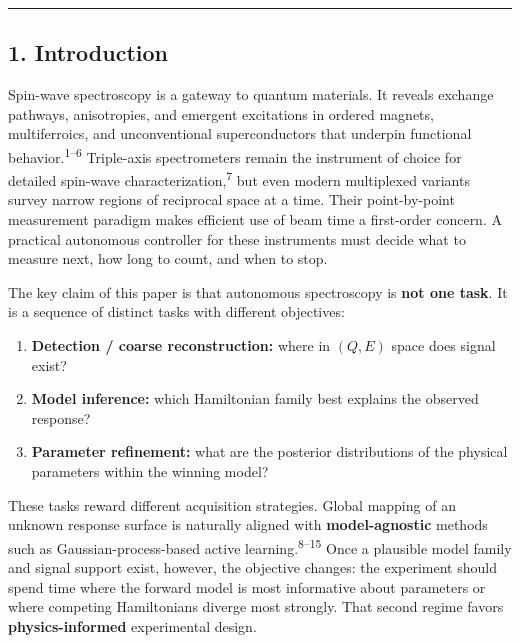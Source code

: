 \documentclass[
]{article}
\providecommand{\tightlist}{%
  \setlength{\itemsep}{0pt}\setlength{\parskip}{0pt}}
\begin{document}
\begin{center}\rule{0.5\linewidth}{0.5pt}\end{center}

\hypertarget{introduction}{%
\subsection{1. Introduction}\label{introduction}}

Spin-wave spectroscopy is a gateway to quantum materials. It reveals
exchange pathways, anisotropies, and emergent excitations in ordered
magnets, multiferroics, and unconventional superconductors that underpin
functional behavior.\textsuperscript{1--6} Triple-axis spectrometers
remain the instrument of choice for detailed spin-wave
characterization,\textsuperscript{7} but even modern multiplexed
variants survey narrow regions of reciprocal space at a time. Their
point-by-point measurement paradigm makes efficient use of beam time a
first-order concern. A practical autonomous controller for these
instruments must decide what to measure next, how long to count, and
when to stop.

The key claim of this paper is that autonomous spectroscopy is
\textbf{not one task}. It is a sequence of distinct tasks with different
objectives:

\begin{enumerate}
\def\labelenumi{\arabic{enumi}.}
\tightlist
\item
  \textbf{Detection / coarse reconstruction:} where in \((Q,E)\) space
  does signal exist?
\item
  \textbf{Model inference:} which Hamiltonian family best explains the
  observed response?
\item
  \textbf{Parameter refinement:} what are the posterior distributions of
  the physical parameters within the winning model?
\end{enumerate}

These tasks reward different acquisition strategies. Global mapping of
an unknown response surface is naturally aligned with
\textbf{model-agnostic} methods such as Gaussian-process-based active
learning.\textsuperscript{8--15} Once a plausible model family and
signal support exist, however, the objective changes: the experiment
should spend time where the forward model is most informative about
parameters or where competing Hamiltonians diverge most strongly. That
second regime favors \textbf{physics-informed} experimental design.
\end{document}
